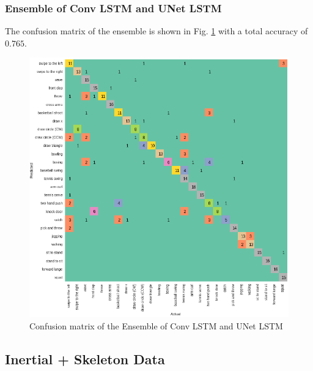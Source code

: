\documentclass[conference]{IEEEtran}
\begin{document}
\subsubsection{Ensemble of Conv LSTM and UNet LSTM}
The confusion matrix of the ensemble is shown in Fig. \ref{fig:confusion_matrix_ensemble} with a total accuracy of $0.765$.
\begin{figure}[H]
\begin{center}
\includegraphics[scale=0.3]{ensemble_conv_UNet_LSTM/ensemble_conv_UNet_lstm_confusion_matrix.png}
\end{center}
\caption{\label{fig:confusion_matrix_ensemble} 
Confusion matrix of the Ensemble of Conv LSTM and UNet LSTM}
\end{figure}

\subsection{Inertial + Skeleton Data}
\end{document}
